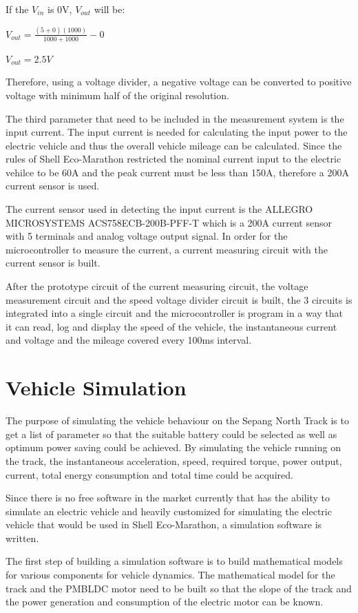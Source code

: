 If the \textit{$V_{in}$} is 0V, \textit{$V_{out}$} will be:

\centerline{$V_{out} = \frac{(5+0)(1000)}{1000+1000} - 0$}
\centerline{$V_{out} = 2.5V$}

Therefore, using a voltage divider, a negative voltage can be converted to positive voltage with minimum half of the original resolution.

The third parameter that need to be included in the measurement system is the input current. The input current is needed for calculating the input power to the electric vehicle and thus the overall vehicle mileage can be calculated. Since the rules of Shell Eco-Marathon restricted the nominal current input to the electric vehilce to be 60A and the peak current must be less than 150A, therefore a 200A current sensor is used.

The current sensor used in detecting the input current is the ALLEGRO MICROSYSTEMS ACS758ECB-200B-PFF-T which is a 200A current sensor with 5 terminals and analog voltage output signal. In order for the microcontroller to measure the current, a current measuring circuit with the current sensor is built.

After the prototype circuit of the current measuring circuit, the voltage measurement circuit and the speed voltage divider circuit is built, the 3 circuits is integrated into a single circuit and the microcontroller is program in a way that it can read, log and display the speed of the vehicle, the instantaneous current and voltage and the mileage covered every 100ms interval.

\section{Vehicle Simulation}
The purpose of simulating the vehicle behaviour on the Sepang North Track is to get a list of parameter so that the suitable battery could be selected as well as optimum power saving could be achieved. By simulating the vehicle running on the track, the instantaneous acceleration, speed, required torque, power output, current, total energy consumption and total time could be acquired.

Since there is no free software in the market currently that has the ability to simulate an electric vehicle and heavily customized for simulating the electric vehicle that would be used in Shell Eco-Marathon, a simulation software is written. 

The first step of building a simulation software is to build mathematical models for various components for vehicle dynamics. The mathematical model for the track and the PMBLDC motor need to be built so that the slope of the track and the power generation and consumption of the electric motor can be known.

